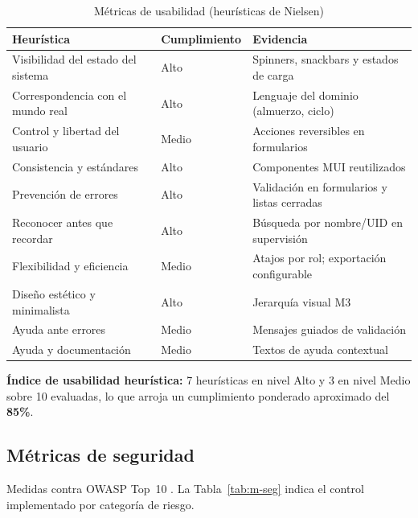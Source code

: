 \begin{table}[H]\centering
\caption{Métricas de usabilidad (heurísticas de Nielsen)}\label{tab:m-usab}
\begin{tabularx}{\textwidth}{L{0.46\textwidth} C{0.16\textwidth} X}
\toprule \textbf{Heurística} & \textbf{Cumplimiento} & \textbf{Evidencia} \\ \midrule
Visibilidad del estado del sistema & Alto & Spinners, snackbars y estados de carga \\
Correspondencia con el mundo real & Alto & Lenguaje del dominio (almuerzo, ciclo) \\
Control y libertad del usuario & Medio & Acciones reversibles en formularios \\
Consistencia y estándares & Alto & Componentes MUI reutilizados \\
Prevención de errores & Alto & Validación en formularios y listas cerradas \\
Reconocer antes que recordar & Alto & Búsqueda por nombre/UID en supervisión \\
Flexibilidad y eficiencia & Medio & Atajos por rol; exportación configurable \\
Diseño estético y minimalista & Alto & Jerarquía visual M3 \\
Ayuda ante errores & Medio & Mensajes guiados de validación \\
Ayuda y documentación & Medio & Textos de ayuda contextual \\
\bottomrule
\end{tabularx}
\end{table}
\noindent\textbf{Índice de usabilidad heurística:} 7 heurísticas en nivel Alto y 3 en
nivel Medio sobre 10 evaluadas, lo que arroja un cumplimiento ponderado aproximado del
\textbf{85\%}.

\subsection{Métricas de seguridad}
Medidas contra OWASP Top~10 \parencite{owasp2021}. La Tabla~\ref{tab:m-seg} indica el
control implementado por categoría de riesgo.

